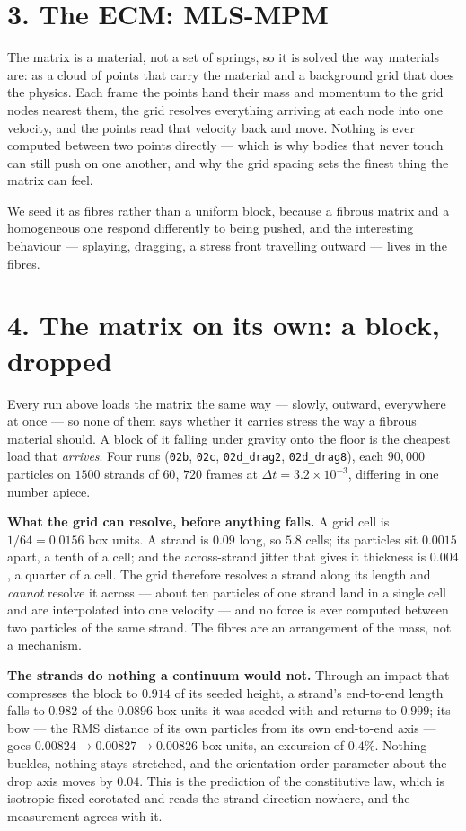 \documentclass[10pt,a4paper]{article}
\newcommand{\op}[1]{\texttt{#1}}
\begin{document}
\section*{3.\; The ECM: MLS-MPM}

The matrix is a material, not a set of springs, so it is solved the way materials are: as a cloud of
points that carry the material and a background grid that does the physics. Each frame the points hand
their mass and momentum to the grid nodes nearest them, the grid resolves everything arriving at each
node into one velocity, and the points read that velocity back and move. Nothing is ever computed
between two points directly --- which is why bodies that never touch can still push on one another, and
why the grid spacing sets the finest thing the matrix can feel.

We seed it as fibres rather than a uniform block, because a fibrous matrix and a homogeneous one respond
differently to being pushed, and the interesting behaviour --- splaying, dragging, a stress front
travelling outward --- lives in the fibres.


\section*{4.\; The matrix on its own: a block, dropped}

Every run above loads the matrix the same way --- slowly, outward, everywhere at once --- so none of
them says whether it carries stress the way a fibrous material should. A block of it falling under
gravity onto the floor is the cheapest load that \emph{arrives}. Four runs
(\op{02b}, \op{02c}, \op{02d\_drag2}, \op{02d\_drag8}), each $90{,}000$ particles on $1500$ strands of
$60$, $720$ frames at $\Delta t=3.2\times10^{-3}$, differing in one number apiece.

\textbf{What the grid can resolve, before anything falls.} A grid cell is $1/64=0.0156$ box units. A
strand is $0.09$ long, so $5.8$ cells; its particles sit $0.0015$ apart, a tenth of a cell; and the
across-strand jitter that gives it thickness is $0.004$, a quarter of a cell. The grid therefore
resolves a strand along its length and \emph{cannot} resolve it across --- about ten particles of one
strand land in a single cell and are interpolated into one velocity --- and no force is ever computed
between two particles of the same strand. The fibres are an arrangement of the mass, not a mechanism.

\textbf{The strands do nothing a continuum would not.} Through an impact that compresses the block to
$0.914$ of its seeded height, a strand's end-to-end length falls to $0.982$ of the $0.0896$ box units
it was seeded with and returns to $0.999$; its bow --- the RMS distance of its own particles from its
own end-to-end axis --- goes $0.00824\to0.00827\to0.00826$ box units, an excursion of $0.4\%$. Nothing
buckles, nothing stays stretched, and the orientation order parameter about the drop axis moves by
$0.04$. This is the prediction of the constitutive law, which is isotropic fixed-corotated and reads
the strand direction nowhere, and the measurement agrees with it.
\end{document}

